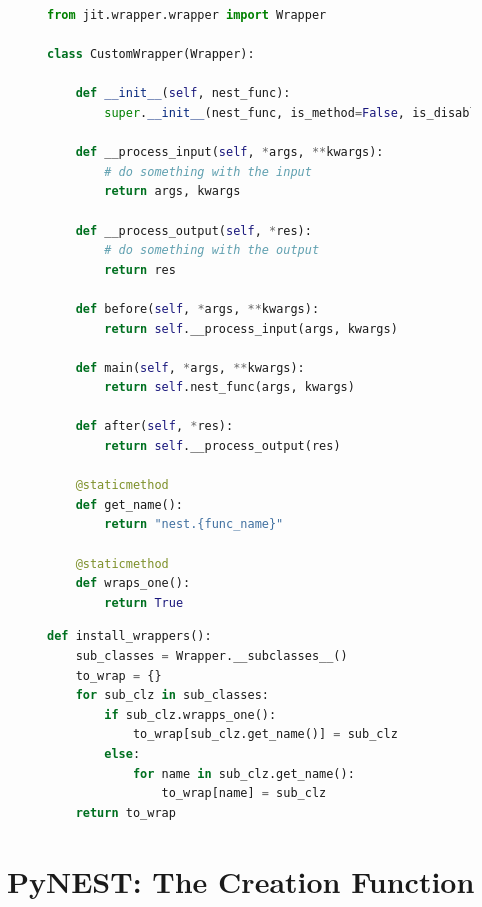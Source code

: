 \begin{figure}[ht!]
\centering
 \begin{lstlisting}[language=Python, label=lst:custom_wrapper, caption={CustomWrapper example}]
from jit.wrapper.wrapper import Wrapper

class CustomWrapper(Wrapper):

    def __init__(self, nest_func):
        super.__init__(nest_func, is_method=False, is_disabled=False)
        
    def __process_input(self, *args, **kwargs):
        # do something with the input
        return args, kwargs

    def __process_output(self, *res):
        # do something with the output
        return res
        
    def before(self, *args, **kwargs):
        return self.__process_input(args, kwargs)
    
    def main(self, *args, **kwargs):
        return self.nest_func(args, kwargs)
        
    def after(self, *res):
        return self.__process_output(res)
        
    @staticmethod
    def get_name():
        return "nest.{func_name}"
    
    @staticmethod
    def wraps_one():
        return True

\end{lstlisting}
\end{figure}




\begin{figure}[ht!]
    \centering
    \begin{lstlisting}[language=Python, label=lst:wrapper_reg, caption={Registering Wrappers}]
def install_wrappers():
    sub_classes = Wrapper.__subclasses__()
    to_wrap = {}
    for sub_clz in sub_classes:
        if sub_clz.wrapps_one():
            to_wrap[sub_clz.get_name()] = sub_clz
        else:
            for name in sub_clz.get_name():
                to_wrap[name] = sub_clz
    return to_wrap
\end{lstlisting}
\end{figure}





\section{PyNEST: The Creation Function}

